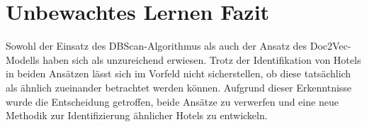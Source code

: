 \section{Unbewachtes Lernen Fazit}
\label{subsubsec:un_fazit}
Sowohl der Einsatz des DBScan-Algorithmus als auch der Ansatz des Doc2Vec-Modells haben sich als unzureichend erwiesen. Trotz der Identifikation von Hotels in beiden Ansätzen lässt sich im Vorfeld nicht sicherstellen, ob diese tatsächlich als ähnlich zueinander betrachtet werden können. Aufgrund dieser Erkenntnisse wurde die Entscheidung getroffen, beide Ansätze zu verwerfen und eine neue Methodik zur Identifizierung ähnlicher Hotels zu entwickeln.